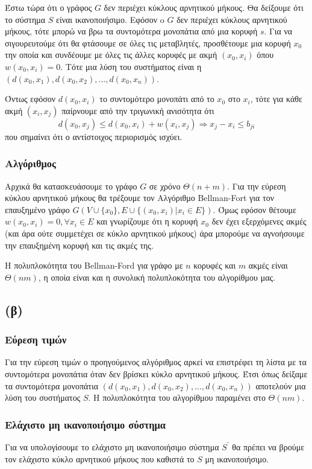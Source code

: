 \documentclass[a4paper,11pt]{article}
\begin{document}
Έστω τώρα ότι ο γράφος $G$ δεν περιέχει κύκλους αρνητικού μήκους. Θα δείξουμε ότι το σύστημα $S$ είναι ικανοποιήσιμο. Εφόσον o $G$ δεν περιέχει κύκλους αρνητικού μήκους, τότε μπορώ να βρω τα συντομότερα μονοπάτια από μια κορυφή $s$. Για να σιγουρευτούμε ότι θα φτάσουμε σε όλες τις μεταβλητές, προσθέτουμε μια κορυφή $x_0$ την οποία και συνδέουμε με όλες τις άλλες κορυφές με ακμή $(x_0,x_i)$ όπου $w(x_0,x_i) = 0$. Τότε μια λύση του συστήματος είναι η $(d(x_0,x_1),d(x_0,x_2),...,d(x_0,x_n))$.

Όντως εφόσον $d(x_0,x_i)$ το συντομότερο μονοπάτι από το $x_0$ στο $x_i$, τότε για κάθε ακμή $(x_i,x_j)$ παίρνουμε από την τριγωνική ανισότητα ότι
$$d(x_0,x_j) \leq d(x_0,x_i) + w(x_i,x_j) \Rightarrow x_j - x_i \leq b_{ji}$$
που σημαίνει ότι ο αντίστοιχος περιορισμός ισχύει.

\subsubsection*{Αλγόριθμος}
Αρχικά θα κατασκευάσουμε το γράφο $G$ σε χρόνο $\Theta(n+m)$. Για την εύρεση κύκλου αρνητικού μήκους θα τρέξουμε τον Αλγόριθμο Bellman-Fort για τον επαυξημένο γράφο $G(V\cup\{x_0\}, E\cup\{(x_0,x_i) | x_i \in E\})$. Όμως εφόσον θέτουμε $w(x_0,x_i)=0, \forall x_i\in E$ και γνωρίζουμε ότι η κορυφή $x_0$ δεν έχει εξερχόμενες ακμές (και άρα ούτε συμμετέχει σε κύκλο αρνητικού μήκους) άρα μπορούμε να αγνοήσουμε την επαυξημένη κορυφή και τις ακμές της.

Η πολυπλοκότητα του Bellman-Ford για γράφο με $n$ κορυφές και $m$ ακμές είναι $\Theta(nm)$, η οποία είναι και η συνολική πολυπλοκότητα του αλγορίθμου μας.

\subsection*{(β)}
\subsubsection*{Εύρεση τιμών}
Για την εύρεση τιμών ο προηγούμενος αλγόριθμος αρκεί να επιστρέφει τη λίστα με τα συντομότερα μονοπάτια όταν δεν βρίσκει κύκλο αρνητικού μήκους. Έτσι όπως δείξαμε τα συντομότερα μονοπάτια $(d(x_0,x_1),d(x_0,x_2),...,d(x_0,x_n))$ αποτελούν μια λύση του συστήματος $S$. Η πολυπλοκότητα του αλγορίθμου παραμένει στο $\Theta(nm)$.

\subsubsection*{Ελάχιστο μη ικανοποιήσιμο σύστημα}
Για να υπολογίσουμε το ελάχιστο μη ικανοποιήσιμο σύστημα $S^\prime$ θα πρέπει να βρούμε τον ελάχιστο κύκλο αρνητικού μήκους που καθιστά το $S$ μη ικανοποιήσιμο.
\end{document}
